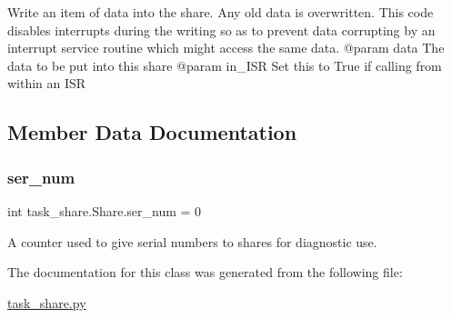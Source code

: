 \begin{DoxyVerb}Write an item of data into the share. Any old data is overwritten.
This code disables interrupts during the writing so as to prevent
data corrupting by an interrupt service routine which might access
the same data.
@param data The data to be put into this share
@param in_ISR Set this to True if calling from within an ISR \end{DoxyVerb}
 

\subsection{Member Data Documentation}
\mbox{\label{classtask__share_1_1Share_a2e8df029af46fbfd44ef0c2e7e8c7af6}} 
\subsubsection{\texorpdfstring{ser\+\_\+num}{ser\_num}}
{\footnotesize\ttfamily int task\+\_\+share.\+Share.\+ser\+\_\+num = 0\hspace{0.3cm}{\ttfamily [static]}}



A counter used to give serial numbers to shares for diagnostic use. 



The documentation for this class was generated from the following file\+:\begin{DoxyCompactItemize}
\item 
\mbox{\hyperlink{task__share_8py}{task\+\_\+share.\+py}}\end{DoxyCompactItemize}
